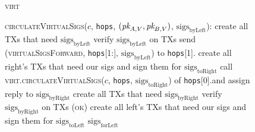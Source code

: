 \begin{figure}[H]
  \begin{processbox}{\textsc{virt}}
    \begin{algorithmic}[1]
      \State \textsc{circulateVirtualSigs}($c$, \texttt{hops}, $(\textit{pk}_{A,
      V}, \textit{pk}_{B, V})$, $\mathrm{sigs}_{\mathrm{byLeft}}$):
      \Indent
         
          \State create all TXs that need $\mathrm{sigs}_{\mathrm{byLeft}}$
          \TODO{}
          \State verify $\mathrm{sigs}_{\mathrm{byLeft}}$ on TXs \TODO{}
           
            \State send (\textsc{virtualSigsForward}, \texttt{hops}[1:],
            $\mathrm{sigs}_{\mathrm{byLeft}}$) to \texttt{hops}[1].\alice{}
            \State {} \TODO{}
            \State {}
            \State {} \TODO{}
            \State {}
            \TODO{}
            \State {} 
          \EndIf
        \Else \: 
          \State create all right's TXs that need our sigs and sign them for
          $\mathrm{sigs}_{\mathrm{toRight}}$ \TODO{}
          \State call \textsc{virt.circulateVirtualSigs}($c$, \texttt{hops},
          $\mathrm{sigs}_{\mathrm{toRight}}$) of \texttt{hops}[0].\bob and
          assign reply to $\mathrm{sigs}_{\mathrm{byRight}}$
          \State create all TXs that need $\mathrm{sigs}_{\mathrm{byRight}}$
          \TODO{}
          \State verify $\mathrm{sigs}_{\mathrm{byRight}}$ on TXs \TODO{}
          \State \Return (\textsc{ok})
        \EndIf
          \State create all left's TXs that need our sigs and sign
          them for $\mathrm{sigs}_{\mathrm{toLeft}}$ \TODO{}
          \State \Return $\mathrm{sigs}_{\mathrm{forLeft}}$
        \EndIf
      \EndIndent
      \Statex

    \end{algorithmic}
  \end{processbox}
  \caption{}
  \label{code:virtual-layer:virtual-sigs}
\end{figure}

